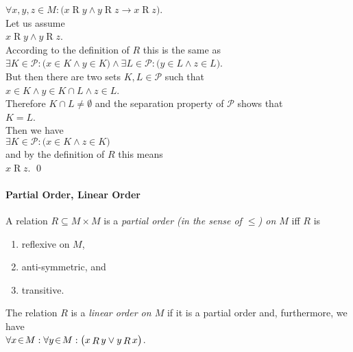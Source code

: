 \begin{enumerate}
      \hspace*{1.3cm}
      $\forall x,y,z \in M:\bigl( x \mathop{R} y \wedge y \mathop{R} z \rightarrow x \mathop{R} z\bigr)$.
      \\[0.2cm]
      Let us assume
      \\[0.2cm]
      \hspace*{1.3cm}
      $x \mathop{R} y \wedge y \mathop{R} z$.
      \\[0.2cm]
      According to the definition of $R$ this is the same as
      \\[0.2cm]
      \hspace*{1.3cm}
      $\exists K \in \mathcal{P}: \bigl(x \in K \wedge y \in K\bigr) \wedge 
       \exists L \in \mathcal{P}: \bigl(y \in L \wedge z \in L\bigr)$.
      \\[0.2cm]
      But then there are two sets $K,L\in\mathcal{P}$ such that
      \\[0.2cm]
      \hspace*{1.3cm}
      $x \in K \wedge y \in K \cap L \wedge z \in L$.
      \\[0.2cm]
      Therefore $K \cap L \not= \emptyset$ and the separation property of  $\mathcal{P}$
      shows that
      \\[0.2cm]
      \hspace*{1.3cm}
      $K = L$.
      \\[0.2cm]
      Then we have 
      \\[0.2cm]
      \hspace*{1.3cm}
      $\exists K \in \mathcal{P}: \bigl(x \in K \wedge z \in K\bigr)$
      \\[0.2cm]
      and by the definition of  $R$ this means
      \\[0.2cm]
      \hspace*{1.3cm}
      $x \mathop{R} z$. 
      \qed
\end{enumerate}
\pagebreak

\paragraph{Partial Order, Linear Order}
A  relation $R \subseteq M \times M$  is a 
\emph{partial order (in the sense of $\leq$) on $M$} iff $R$ is
\begin{enumerate}
\item reflexive on $M$,
\item anti-symmetric, and
\item transitive.
\end{enumerate}
The relation $R$ is a \emph{linear order on $M$} if it is a partial order and,
furthermore, we have
\\[0.2cm]
\hspace*{1.3cm} $\forall x \!\in\! M : \forall y \!\in\! M :\bigl( x\mathop{R}y \vee y \mathop{R} x\bigr)$.

